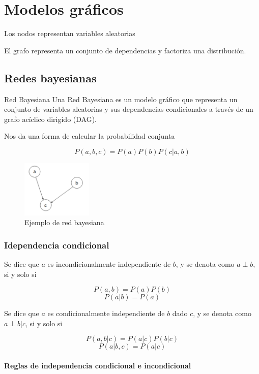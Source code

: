 \chapter{Modelos gráficos}

Los nodos representan variables aleatorias

El grafo representa un conjunto de dependencias y
factoriza una distribución.

\section{Redes bayesianas}

\begin{definitionbox}{Red Bayesiana}
    Una Red Bayesiana es un modelo gráfico que representa un conjunto de
    variables aleatorias y sus dependencias condicionales a través de un grafo
    acíclico dirigido (DAG).
\end{definitionbox}

Nos da una forma de calcular la probabilidad conjunta

$$ P(a, b, c) = P(a) P(b) P(c|a, b) $$

\begin{figure}[H]
    \centering
    \includegraphics[width=0.3\textwidth]{images/red_bayesiana_simple.png}
    \caption{Ejemplo de red bayesiana}
\end{figure}

\subsection{Idependencia condicional}

Se dice que $a$ es incondicionalmente independiente de $b$, y se denota
como $a \perp b$, si y solo si

$$ P(a, b) = P(a) P(b) $$
$$ P(a|b) = P(a) $$

Se dice que $a$ es condicionalmente independiente de $b$ dado $c$, y se
denota como $a \perp b | c$, si y solo si

$$ P(a, b|c) = P(a|c) P(b|c) $$
$$ P(a|b, c) = P(a|c) $$

\subsubsection{Reglas de independencia condicional e incondicional}

